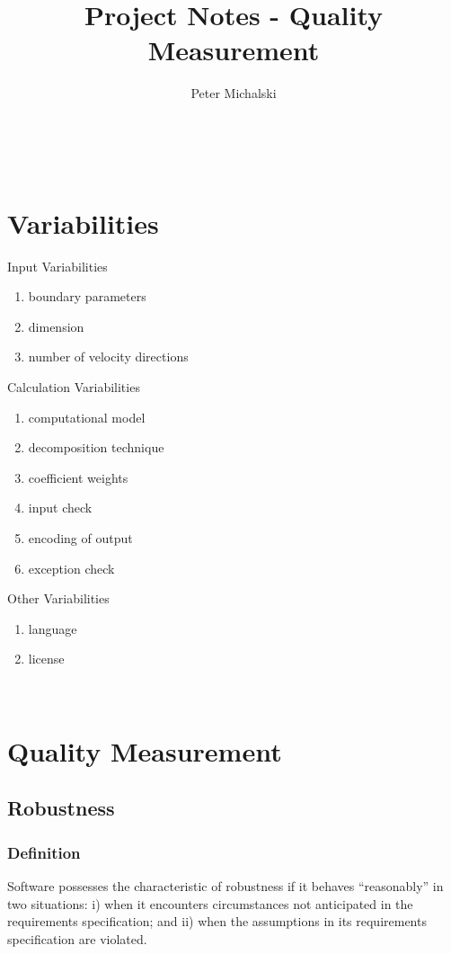 \documentclass{article}
\title{Project Notes - Quality Measurement}
\author{Peter Michalski}
\date{}
\begin{document}
\maketitle


\newpage

\tableofcontents
{}

~\newpage
\section{Variabilities}

Input Variabilities
\begin{enumerate}
	\item boundary parameters
	\item dimension
	\item number of velocity directions
\end{enumerate}

\noindent Calculation Variabilities
\begin{enumerate}
	\item computational model
	\item decomposition technique
	\item coefficient weights
	\item input check
	\item encoding of output
	\item exception check
\end{enumerate}

\noindent Other Variabilities
\begin{enumerate}
	\item language
	\item license
\end{enumerate}

~\newpage
\section{Quality Measurement}
\subsection{Robustness}
\subsubsection{Definition}
Software possesses the characteristic of robustness if it behaves ``reasonably'' in two situations: i) when it encounters circumstances not anticipated in the requirements specification; and ii) when the assumptions in its requirements specification are violated.
\end{document}

